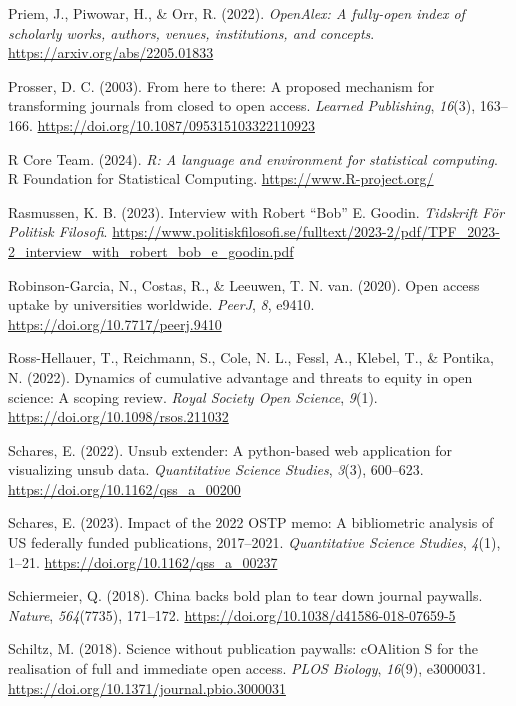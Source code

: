 \documentclass[a4paper,man,floatsintext,longtable,noextraspace,12pt]{apa6}
\newlength{\cslhangindent}
\newenvironment{CSLReferences}[2] %
  {\begin{list}{}{%
   \setlength{\itemindent}{0pt}
   \setlength{\leftmargin}{0pt}
   \setlength{\parsep}{0pt}
   \ifodd #1
    \setlength{\leftmargin}{\cslhangindent}
    \setlength{\itemindent}{-1\cslhangindent}
   \fi
   \setlength{\itemsep}{#2\baselineskip}}}
  {\end{list}}
\begin{document}
\begin{CSLReferences}{1}{0}
Priem, J., Piwowar, H., \& Orr, R. (2022). \emph{OpenAlex: A fully-open
index of scholarly works, authors, venues, institutions, and concepts}.
\url{https://arxiv.org/abs/2205.01833}

Prosser, D. C. (2003). From here to there: A proposed mechanism for
transforming journals from closed to open access. \emph{Learned
Publishing}, \emph{16}(3), 163--166.
\url{https://doi.org/10.1087/095315103322110923}

R Core Team. (2024). \emph{R: A language and environment for statistical
computing}. R Foundation for Statistical Computing.
\url{https://www.R-project.org/}

Rasmussen, K. B. (2023). Interview with {Robert {``Bob''} E. Goodin}.
\emph{Tidskrift För Politisk Filosofi}.
\url{https://www.politiskfilosofi.se/fulltext/2023-2/pdf/TPF_2023-2_interview_with_robert_bob_e_goodin.pdf}

Robinson-Garcia, N., Costas, R., \& Leeuwen, T. N. van. (2020). Open
access uptake by universities worldwide. \emph{{PeerJ}}, \emph{8},
e9410. \url{https://doi.org/10.7717/peerj.9410}

Ross-Hellauer, T., Reichmann, S., Cole, N. L., Fessl, A., Klebel, T., \&
Pontika, N. (2022). Dynamics of cumulative advantage and threats to
equity in open science: A scoping review. \emph{Royal Society Open
Science}, \emph{9}(1). \url{https://doi.org/10.1098/rsos.211032}

Schares, E. (2022). Unsub extender: A python-based web application for
visualizing unsub data. \emph{Quantitative Science Studies},
\emph{3}(3), 600--623. \url{https://doi.org/10.1162/qss_a_00200}

Schares, E. (2023). Impact of the 2022 OSTP memo: A bibliometric
analysis of US federally funded publications, 2017--2021.
\emph{Quantitative Science Studies}, \emph{4}(1), 1--21.
\url{https://doi.org/10.1162/qss_a_00237}

Schiermeier, Q. (2018). China backs bold plan to tear down journal
paywalls. \emph{Nature}, \emph{564}(7735), 171--172.
\url{https://doi.org/10.1038/d41586-018-07659-5}

Schiltz, M. (2018). Science without publication paywalls: {cOAlition S}
for the realisation of full and immediate open access. \emph{PLOS
Biology}, \emph{16}(9), e3000031.
\url{https://doi.org/10.1371/journal.pbio.3000031}


\end{CSLReferences}
\end{document}
